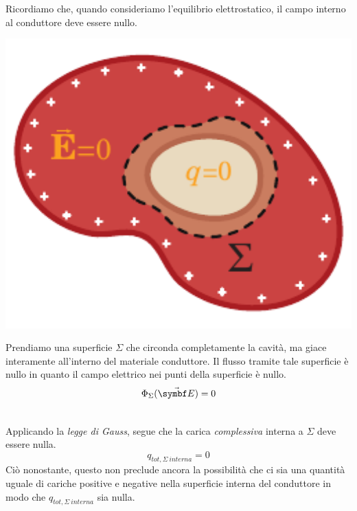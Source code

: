 \begin{demonstration}
	Ricordiamo che, quando consideriamo l'equilibrio elettrostatico, il campo interno al conduttore deve essere nullo.\\
\begin{minipage}{0.35\textwidth}
	\begin{center}
		\includegraphics[width=1\textwidth]{images/chp4/chp4condcavodim1.pdf}
	\end{center}
\end{minipage}\hspace{5pt}
\begin{minipage}{0.64\textwidth}
	Prendiamo una superficie $\Sigma$ che circonda completamente la cavità, ma giace interamente all'interno del materiale conduttore.
	Il flusso tramite tale superficie è nullo in quanto il campo elettrico nei punti della superficie è nullo.
	\begin{equation*}
		\Phi_{\Sigma}(\vba{E})=0
	\end{equation*}
\end{minipage}\\
	Applicando la \textit{legge di Gauss}, segue che la carica \textit{complessiva} interna a $\Sigma$ deve essere nulla.
\begin{equation}
	q_{tot,\Sigma\ interna}=0
\end{equation}
Ciò nonostante, questo non preclude ancora la possibilità che ci sia una quantità uguale di cariche positive e negative nella superficie interna del conduttore in modo che	$q_{tot,\Sigma\ interna}$ sia nulla.\\

\end{demonstration}
